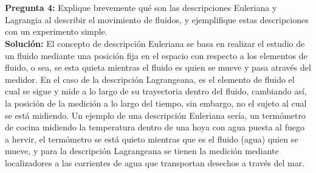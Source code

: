 \documentclass[11pt,letterpaper]{article}
\begin{document}
\\
\\
\textbf{Pregunta 4:} Explique brevemente qué son las descripciones Euleriana y Lagrangia al describir el
movimiento de fluidos, y ejemplifique estas descripciones con un experimento simple. \\
\textbf{Solución:} El concepto de descripción Euleriana se basa en realizar el estudio de un fluido mediante una posición fija en el espacio con respecto a los elementos de fluido, o sea, se esta quieta mientras el fluido es quien se mueve y pasa através del medidor. En el caso de la descripción Lagrangeana, es el elemento de fluido el cual se sigue y mide a lo largo de su trayectoria dentro del fluido, cambiando así, la posición de la medición a lo largo del tiempo, sin embargo, no el sujeto al cual se está midiendo. Un ejemplo de una descripción Euleriana sería, un termómetro de cocina midiendo la temperatura dentro de una hoya con agua puesta al fuego a hervir, el termómetro se está quieto mientras que es el fluido (agua) quien se mueve, y para la descripción Lagrangeana se tienen la medición mediante localizadores a las corrientes de agua que transportan desechos a través del mar.\\
\\
\end{document}
